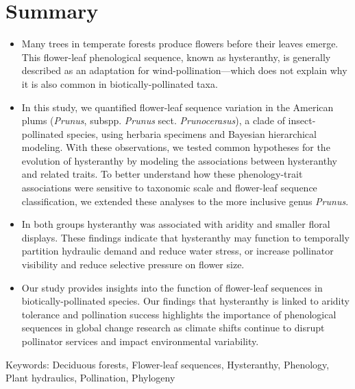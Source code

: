\documentclass{article}[12pt]
\begin{document}
\section*{Summary} %
\begin{itemize}
\item Many trees in temperate forests produce flowers before their leaves emerge. This flower-leaf phenological sequence, known as hysteranthy, is generally described as an adaptation for wind-pollination---which does not explain why it is also common in biotically-pollinated taxa. 

\item In this study, we quantified flower-leaf sequence variation in the American plums (\emph{Prunus}, subspp. \emph{Prunus} sect. \emph{Prunocerasus}), a clade of insect-pollinated species, using herbaria specimens and Bayesian hierarchical modeling. With these observations, we tested common hypotheses for the evolution of hysteranthy by modeling the associations between hysteranthy and related traits. To better understand how these phenology-trait associations were sensitive to taxonomic scale and flower-leaf sequence classification, we extended these analyses to the more inclusive genus \emph{Prunus}. 

\item In both groups hysteranthy was associated with aridity and smaller floral displays. These findings indicate that hysteranthy may function to temporally partition hydraulic demand and reduce water stress, or increase pollinator visibility and reduce selective pressure on flower size.

\item Our study provides insights into the function of flower-leaf sequences in biotically-pollinated species.  %
Our findings that hysteranthy is linked to aridity tolerance and pollination success %
highlights the importance of phenological sequences in global change research as climate shifts continue to disrupt pollinator services and impact environmental variability.\\
\end{itemize}

Keywords: Deciduous forests, Flower-leaf sequences, Hysteranthy, Phenology, Plant hydraulics, Pollination, Phylogeny
\end{document}
